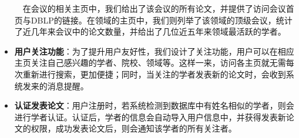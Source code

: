 \begin{itemize}
$\quad$在会议的相关主页中，我们给出了该会议的所有论文，并提供了访问会议首页与DBLP的链接。在领域的主页中，我们则列举了该领域的顶级会议，统计了近几年来会议中的论文数量，并给出了几位近五年来领域最活跃的学者。

\item {\bf 用户关注功能}：为了提升用户友好性，我们设计了关注功能，用户可以在相应主页关注自己感兴趣的学者、院校、领域等。这样一来，访问各主页就无需每次重新进行搜索，更加便捷；同时，当关注的学者发表新的论文时，会收到系统发来的消息提醒。

\begin{figure}[h]
\centering
{}
\hspace{0.3cm}
\end{figure}

\item {\bf 认证发表论文}：用户注册时，若系统检测到数据库中有姓名相似的学者，则会进行学者认证。认证后，学者的信息会自动导入用户信息中，并获得发表新论文的权限，成功发表论文后，则会通知该学者的所有关注者。

\begin{figure}[h]
\centering
{}
\hspace{0.3cm}
\end{figure}


\end{itemize}
